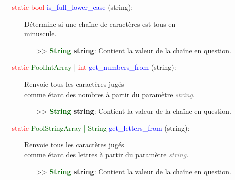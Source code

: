 \documentclass[a4paper, 11pt]{article}
\begin{document}
	\begin{description}
		\item [+ \textcolor{red}{static bool} \textcolor{blue}{is\_full\_lower\_case} (string):] Détermine 
		si une chaîne de caractères est tous en \\minuscule.
		\begin{itemize}
			\item [>> \textbf{\textcolor{darkgreen}{String} string}:] Contient la valeur de la chaîne en 
			question.\\
		\end{itemize}
	\end{description}
	\begin{description}
		\item [+ \textcolor{red}{static} \textcolor{darkgreen}{PoolIntArray} | \textcolor{red}{int} 
		\textcolor{blue}{get\_numbers\_from} (string):] Renvoie tous les caractères jugés \\comme étant des 
		nombres à partir du paramètre \textit{\textcolor{gray}{string}}.
		\begin{itemize}
			\item [>> \textbf{\textcolor{darkgreen}{String} string}:] Contient la valeur de la chaîne en 
			question.\\
		\end{itemize}
	\end{description}
	\begin{description}
		\item [+ \textcolor{red}{static} \textcolor{darkgreen}{PoolStringArray | String} \textcolor{blue}
		{get\_letters\_from} (string):] Renvoie tous les caractères jugés \\comme étant des lettres à partir 
		du paramètre \textit{\textcolor{gray}{string}}.
		\begin{itemize}
			\item [>> \textbf{\textcolor{darkgreen}{String} string}:] Contient la valeur de la chaîne en 
			question.\\
		\end{itemize}
	\end{description}
\end{document}
